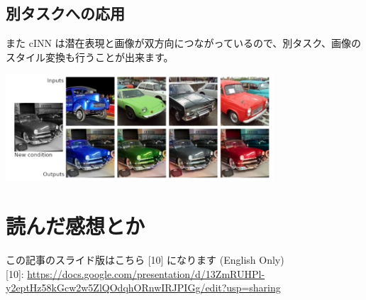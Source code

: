 \documentclass[a4paper, dvipdfmx, 10pt]{article}
\begin{document}
\subsection{別タスクへの応用}
\label{sec:org0d8ce66}
また cINN は潜在表現と画像が双方向につながっているので、別タスク、画像のスタイル変換も行うことが出来ます。\\

\begin{center}
\includegraphics[width=10cm]{./img/cinn_st.png}
\end{center}

\section{読んだ感想とか}
\label{sec:orgf52cc0a}
この記事のスライド版はこちら [10] になります (English Only)\\


[10]: \url{https://docs.google.com/presentation/d/13ZmRUHPl-y2eptHz58kGcw2w5ZlQOdqhORnwIRJPIGg/edit?usp=sharing}\\
\end{document}
